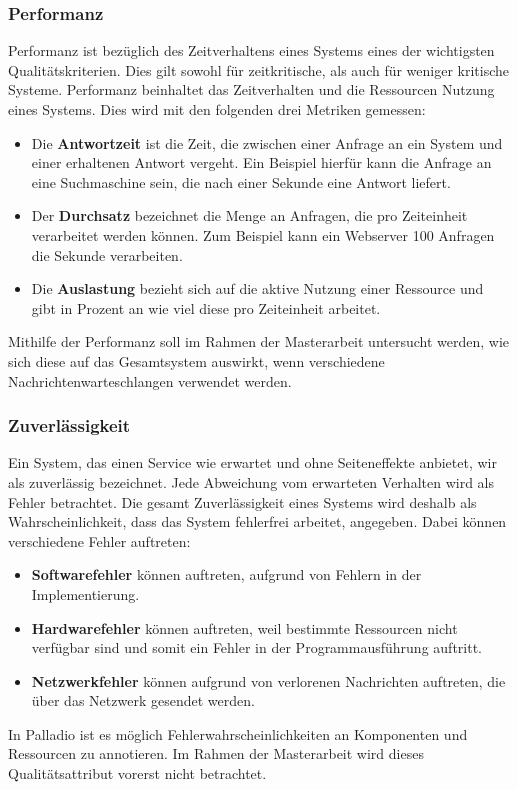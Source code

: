 \subsubsection{Performanz} 
Performanz ist bezüglich des Zeitverhaltens eines Systems eines der wichtigsten Qualitätskriterien. Dies gilt sowohl für zeitkritische, als auch für weniger kritische Systeme. Performanz beinhaltet das Zeitverhalten und die Ressourcen Nutzung eines Systems. Dies wird mit den folgenden drei Metriken gemessen:
\begin{itemize}
\item Die \textbf{Antwortzeit} ist die Zeit, die zwischen einer Anfrage an ein System und einer erhaltenen Antwort vergeht. Ein Beispiel hierfür kann die Anfrage an eine Suchmaschine sein, die nach einer Sekunde eine Antwort liefert.
\item Der \textbf{Durchsatz} bezeichnet die Menge an Anfragen, die pro Zeiteinheit verarbeitet werden können. Zum Beispiel kann ein Webserver 100 Anfragen die Sekunde verarbeiten.
\item Die \textbf{Auslastung} bezieht sich auf die aktive Nutzung einer Ressource und gibt in Prozent an wie viel diese pro Zeiteinheit arbeitet. 
\end{itemize}
Mithilfe der Performanz soll im Rahmen der Masterarbeit untersucht werden, wie sich diese auf das Gesamtsystem auswirkt, wenn verschiedene Nachrichtenwarteschlangen verwendet werden.

\subsubsection{Zuverlässigkeit}
Ein System, das einen Service wie erwartet und ohne Seiteneffekte anbietet, wir als zuverlässig bezeichnet. Jede Abweichung vom erwarteten Verhalten wird als Fehler betrachtet. Die gesamt Zuverlässigkeit eines Systems wird deshalb als Wahrscheinlichkeit, dass das System fehlerfrei arbeitet, angegeben. Dabei können verschiedene Fehler auftreten:
\begin{itemize}
\item \textbf{Softwarefehler} können auftreten, aufgrund von Fehlern in der Implementierung.
\item \textbf{Hardwarefehler} können auftreten, weil bestimmte Ressourcen nicht verfügbar sind und somit ein Fehler in der Programmausführung auftritt.
\item \textbf{Netzwerkfehler} können aufgrund von verlorenen Nachrichten auftreten, die über das Netzwerk gesendet werden.
\end{itemize}
In Palladio ist es möglich Fehlerwahrscheinlichkeiten an Komponenten und Ressourcen zu annotieren. Im Rahmen der Masterarbeit wird dieses Qualitätsattribut vorerst nicht betrachtet.

